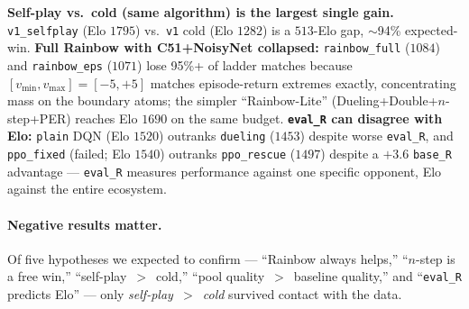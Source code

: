 \textbf{Self-play vs.\ cold (same algorithm) is the largest single
gain.} \texttt{v1\_selfplay} (Elo $1795$) vs.\ \texttt{v1} cold (Elo
$1282$) is a $513$-Elo gap, $\sim$94\% expected-win.
\textbf{Full Rainbow with C51+NoisyNet collapsed:} \texttt{rainbow\_full}
($1084$) and \texttt{rainbow\_eps} ($1071$) lose 95\%+ of ladder
matches because $[v_{\min},v_{\max}]{=}[-5,+5]$ matches episode-return
extremes exactly, concentrating mass on the boundary atoms; the simpler
``Rainbow-Lite'' (Dueling+Double+$n$-step+PER) reaches Elo $1690$ on
the same budget. \textbf{\texttt{eval\_R} can disagree with Elo:}
\texttt{plain} DQN (Elo $1520$) outranks \texttt{dueling} ($1453$)
despite worse \texttt{eval\_R}, and \texttt{ppo\_fixed} (failed; Elo
$1540$) outranks \texttt{ppo\_rescue} ($1497$) despite a $+3.6$
\texttt{base\_R} advantage --- \texttt{eval\_R} measures performance
against one specific opponent, Elo against the entire ecosystem.

\paragraph{Negative results matter.} Of five hypotheses we expected to
confirm --- ``Rainbow always helps,'' ``$n$-step is a free win,''
``self-play~$>$~cold,'' ``pool quality~$>$~baseline quality,'' and
``\texttt{eval\_R} predicts Elo'' --- only \emph{self-play~$>$~cold}
survived contact with the data.

